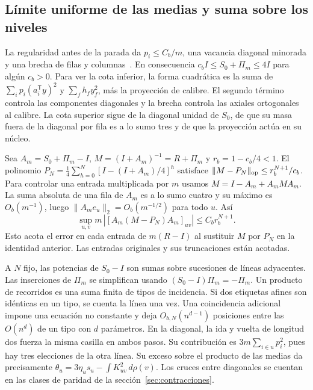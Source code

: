 \subsection{Límite uniforme de las medias y suma sobre los niveles}
La regularidad antes de la parada da \(p_i\le C_b/m\), una vacancia diagonal
minorada y una brecha de filas y columnas~\cite[\S7]{pc}.
En consecuencia \(c_b I\le S_0+\Pi_m\le 4I\) para algún \(c_b>0\).
Para ver la cota inferior, la forma cuadrática es la suma de
\(\sum_i p_i(a_i^{\mathsf T}y)^2\) y \(\sum_f h_f y_f^2\), más la proyección de calibre.
El segundo término controla las componentes diagonales y la brecha controla las axiales
ortogonales al calibre. La cota superior sigue de la diagonal unidad de \(S_0\), de que su
masa fuera de la diagonal por fila es a lo sumo tres y de que la proyección actúa en su núcleo.

Sea \(A_m=S_0+\Pi_m-I\), \(M=(I+A_m)^{-1}=R+\Pi_m\) y \(r_b=1-c_b/4<1\).
El polinomio \(P_N=\tfrac14\sum_{h=0}^N[I-(I+A_m)/4]^h\) satisface
\(\|M-P_N\|_{\rm op}\le r_b^{N+1}/c_b\). Para controlar una entrada multiplicada
por \(m\) usamos \(M=I-A_m+A_mMA_m\). La suma absoluta de una fila de \(A_m\) es
a lo sumo cuatro y su máximo es \(O_b(m^{-1})\), luego
\(\|A_me_u\|_2=O_b(m^{-1/2})\) para todo \(u\). Así
\[
 \sup_{u,v}m\,|[A_m(M-P_N)A_m]_{uv}|\le C_b r_b^{N+1}.
\]
Esto acota el error en cada entrada de \(m(R-I)\) al sustituir \(M\) por \(P_N\)
en la identidad anterior. Las entradas originales y sus truncaciones están acotadas.

A \(N\) fijo, las potencias de \(S_0-I\) son sumas sobre sucesiones de líneas adyacentes.
Las inserciones de \(\Pi_m\) se simplifican usando \((S_0-I)\Pi_m=-\Pi_m\).
Un producto de recorridos es una suma finita de tipos de incidencia. Si dos etiquetas afines
son idénticas en un tipo, se cuenta la línea una vez. Una coincidencia adicional impone
una ecuación no constante y deja \(O_{b,N}(n^{d-1})\) posiciones entre las \(O(n^d)\)
de un tipo con \(d\) parámetros. En la diagonal, la ida y vuelta de longitud dos fuerza
la misma casilla en ambos pasos. Su contribución es \(3m\sum_{i\in u}p_i^2\), pues hay tres
elecciones de la otra línea. Su exceso sobre el producto de las medias da precisamente
\(\theta_u=3\eta_u s_u-\int K_{uv}^2\,d\rho(v)\). Los cruces entre diagonales se
cuentan en las clases de paridad de la sección~\ref{sec:contracciones}.

